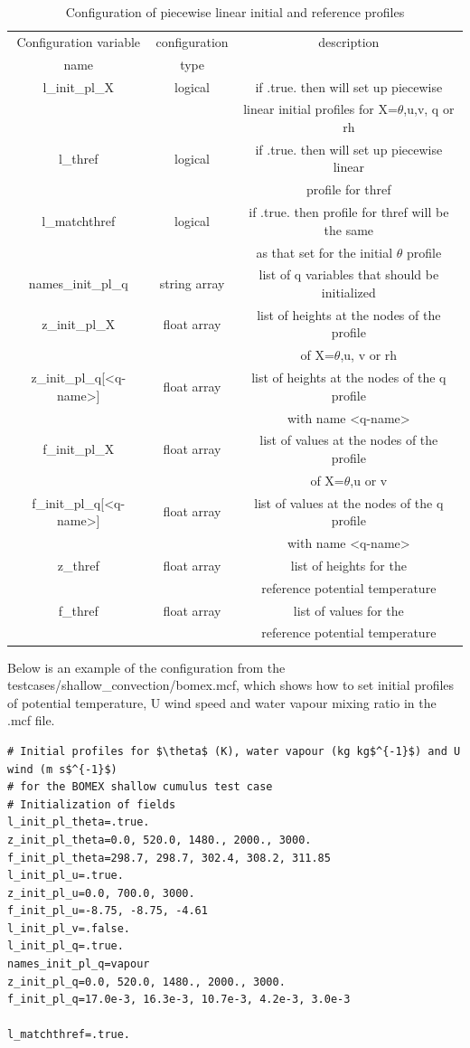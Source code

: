 \documentclass[a4paper,11pt]{article}
\begin{document}
\begin{table}[H]
\protect\caption{Configuration of piecewise linear initial and reference profiles}
\label{tab:init_profile}
\begin{tabular}{|c|c|c|}
\hline
Configuration variable & configuration  & description\tabularnewline
name & type & \tabularnewline
\hline
\hline
l\_init\_pl\_X & logical & if .true. then will set up piecewise  \tabularnewline
 &  & linear initial profiles for X=$\theta$,u,v, q or rh\tabularnewline
\hline
l\_thref & logical & if .true. then will set up piecewise linear \tabularnewline
 &  & profile for thref\tabularnewline
\hline
l\_matchthref & logical & if .true. then profile for thref will be the same\tabularnewline
 &  &  as that set for the initial $\theta$ profile\tabularnewline
\hline
names\_init\_pl\_q & string array & list of q variables that should be initialized\tabularnewline
\hline
z\_init\_pl\_X & float array & list of heights at the nodes of the profile\tabularnewline
 &  & of X=$\theta$,u, v or rh\tabularnewline
\hline
z\_init\_pl\_q{[\textless q-name\textgreater]} & float array & list of heights at the nodes of the q profile\tabularnewline
 &  & with name \textless q-name\textgreater\tabularnewline
\hline
f\_init\_pl\_X & float array & list of values at the nodes of the profile\tabularnewline
 &  & of X=$\theta$,u or v\tabularnewline
\hline
f\_init\_pl\_q{[\textless q-name\textgreater]} & float array & list of values at the nodes of the q profile\tabularnewline
 &  & with name \textless q-name\textgreater\tabularnewline
\hline
z\_thref & float array & list of heights for the \tabularnewline
 &  & reference potential temperature \tabularnewline
\hline
f\_thref & float array & list of values for the \tabularnewline
 &  & reference potential temperature \tabularnewline
\hline
\end{tabular}
\end{table}

Below is an example of the configuration from the testcases/shallow\_convection/bomex.mcf,
which shows how to set initial profiles of potential temperature, U wind speed and
water vapour mixing ratio in the .mcf file.

\begin{lstlisting}[caption={Example configuration snippet for initial profiles from bomex.mcf}]
# Initial profiles for $\theta$ (K), water vapour (kg kg$^{-1}$) and U wind (m s$^{-1}$)
# for the BOMEX shallow cumulus test case
# Initialization of fields
l_init_pl_theta=.true.
z_init_pl_theta=0.0, 520.0, 1480., 2000., 3000.
f_init_pl_theta=298.7, 298.7, 302.4, 308.2, 311.85
l_init_pl_u=.true.
z_init_pl_u=0.0, 700.0, 3000.
f_init_pl_u=-8.75, -8.75, -4.61
l_init_pl_v=.false.
l_init_pl_q=.true.
names_init_pl_q=vapour
z_init_pl_q=0.0, 520.0, 1480., 2000., 3000.
f_init_pl_q=17.0e-3, 16.3e-3, 10.7e-3, 4.2e-3, 3.0e-3

l_matchthref=.true.
\end{lstlisting}
\end{document}
